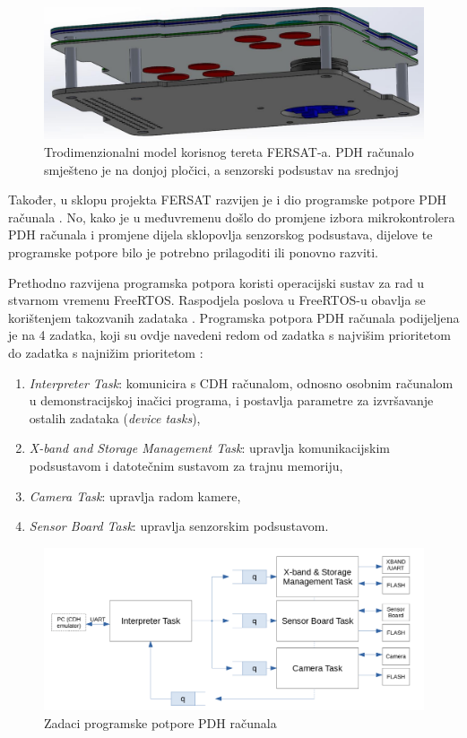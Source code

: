 \begin{figure}[htb]
    \centering
    \includegraphics[width=\textwidth]{slike/fersat_3d.png}
    \caption{Trodimenzionalni model korisnog tereta FERSAT-a. PDH računalo smješteno je na donjoj pločici, a senzorski podsustav na srednjoj \cite{zavrsni_filip_juric}}
    \label{fig:fersat_3d}
\end{figure}

Također, u sklopu projekta FERSAT razvijen je i dio programske potpore PDH računala \cite{diplomski_goran_petrak}. No, kako je u međuvremenu došlo do promjene izbora mikrokontrolera PDH računala i promjene dijela sklopovlja senzorskog podsustava, dijelove te programske potpore bilo je potrebno prilagoditi ili ponovno razviti.

Prethodno razvijena programska potpora koristi operacijski sustav za rad u stvarnom vremenu FreeRTOS. Raspodjela poslova u FreeRTOS-u obavlja se korištenjem takozvanih zadataka . Programska potpora PDH računala podijeljena je na 4 zadatka, koji su ovdje navedeni redom od zadatka s najvišim prioritetom do zadatka s najnižim prioritetom \cite{diplomski_goran_petrak}:

\begin{enumerate}
    \item \textit{Interpreter Task}: komunicira s CDH računalom, odnosno osobnim računalom u demonstracijskoj inačici programa, i postavlja parametre za izvršavanje ostalih zadataka (\textit{device tasks}),
    \item \textit{X-band and Storage Management Task}: upravlja komunikacijskim podsustavom i datotečnim sustavom za trajnu memoriju,
    \item \textit{Camera Task}: upravlja radom kamere,
    \item \textit{Sensor Board Task}: upravlja senzorskim podsustavom.
\end{enumerate}

\begin{figure}[htb]
    \centering
    \includegraphics[width=\textwidth]{slike/rtos_zadaci.png}
    \caption{Zadaci programske potpore PDH računala \cite{diplomski_goran_petrak}}
    \label{fig:rtos_zadaci}
\end{figure}

